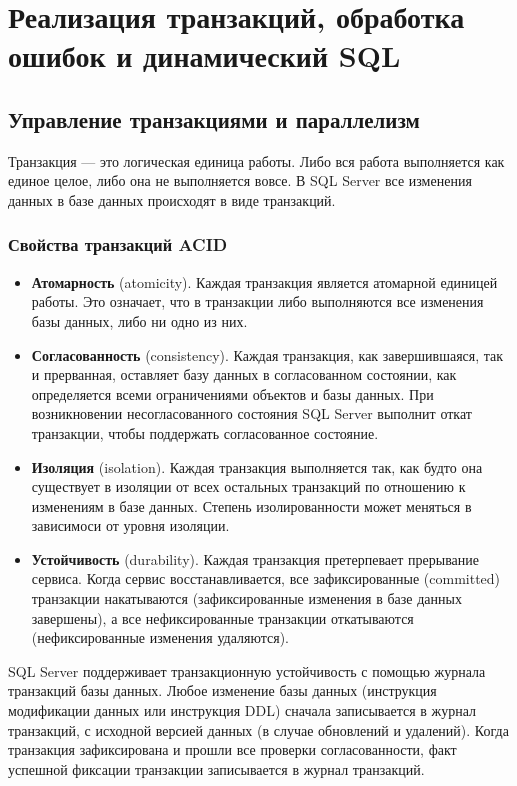 \chapter{Реализация транзакций, обработка ошибок и динамический SQL}
\section{Управление транзакциями и параллелизм}

Транзакция — это логическая единица работы. Либо вся работа выполняется
как единое целое, либо она не выполняется вовсе.
В SQL Server все изменения данных в базе данных происходят в виде транзакций. 





\subsection{Свойства транзакций ACID}


\begin{itemize}
	\item \textbf{Атомарность} (atomicity). Каждая транзакция является атомарной единицей работы. Это означает, что в транзакции либо выполняются все изменения базы
	данных, либо ни одно из них. 
	\item \textbf{Согласованность} (consistency). Каждая транзакция, как завершившаяся, так и
	прерванная, оставляет базу данных в согласованном состоянии, как определяется всеми ограничениями объектов и базы данных. При возникновении несогласованного состояния SQL Server выполнит откат транзакции, чтобы поддержать
	согласованное состояние. 
	\item \textbf{Изоляция} (isolation). Каждая транзакция выполняется так, как будто она существует в изоляции от всех остальных транзакций по отношению к изменениям в
	базе данных. Степень изолированности может меняться в зависимоси от уровня
	изоляции. 
	\item  \textbf{Устойчивость} (durability). Каждая транзакция претерпевает прерывание сервиса. Когда сервис восстанавливается, все зафиксированные (committed) транзакции накатываются (зафиксированные изменения в базе данных завершены), а
	все нефиксированные транзакции откатываются (нефиксированные изменения
	удаляются). 
\end{itemize}

SQL Server поддерживает транзакционную устойчивость с помощью журнала транзакций базы данных. Любое изменение базы данных (инструкция модификации
данных или инструкция DDL) сначала записывается в журнал транзакций, с исходной версией данных (в случае обновлений и удалений). Когда транзакция зафиксирована и прошли все проверки согласованности, факт успешной фиксации транзакции записывается в журнал транзакций. 

